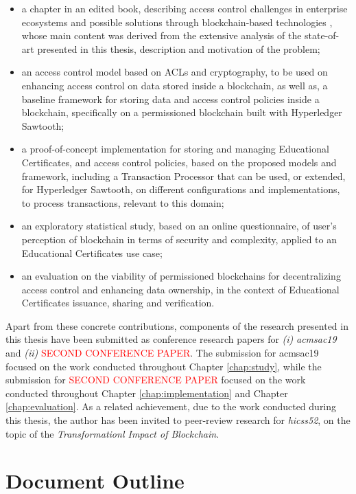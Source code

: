 \begin{itemize}
    \item a chapter in an edited book, describing access control challenges in enterprise ecosystems and possible solutions through blockchain-based technologies \cite{bryan_christiansen_access_2018}, whose main content was derived from the extensive analysis of the state-of-art presented in this thesis, description and motivation of the problem;
    \item an access control model based on ACLs and cryptography, to be used on enhancing access control on data stored inside a blockchain, as well as, a baseline framework for storing data and access control policies inside a blockchain, specifically on a permissioned blockchain built with Hyperledger Sawtooth;
    \item a proof-of-concept implementation for storing and managing Educational Certificates, and access control policies, based on the proposed models and framework, including a Transaction Processor that can be used, or extended, for Hyperledger Sawtooth, on different configurations and implementations, to process transactions, relevant to this domain;
    \item an exploratory statistical study, based on an online questionnaire, of user's perception of blockchain in terms of security and complexity, applied to an Educational Certificates use case;
    \item an evaluation on the viability of permissioned blockchains for decentralizing access control and enhancing data ownership, in the context of Educational Certificates issuance, sharing and verification.
\end{itemize}

Apart from these concrete contributions, components of the research presented in this thesis have been submitted as conference research papers for \emph{(i)} \textit{\gls{acmsac19}} and \emph{(ii)} \textcolor{red}{SECOND CONFERENCE PAPER}. The submission for \gls{acmsac19} focused on the work conducted throughout Chapter \ref{chap:study}, while the submission for \textcolor{red}{SECOND CONFERENCE PAPER} focused on the work conducted throughout Chapter \ref{chap:implementation} and Chapter \ref{chap:evaluation}. As a related achievement, due to the work conducted during this thesis, the author has been invited to peer-review research for \textit{\glsdesc{hicss52}}, on the topic of the \textit{Transformationl Impact of Blockchain}.

\section{Document Outline}

